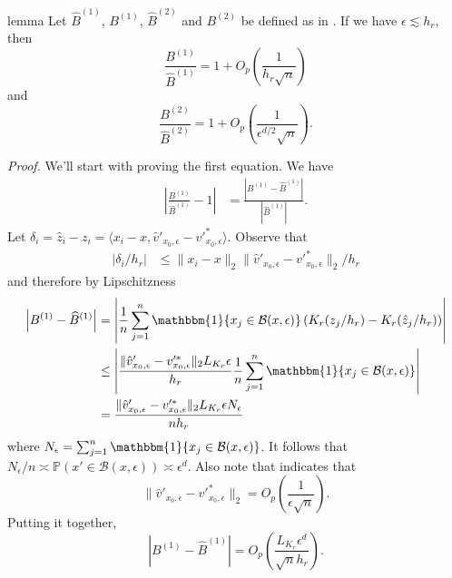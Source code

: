 \documentclass[11pt]{article}
\begin{document}
\begin{restatable}{lemma}{} \label{lemma: regression ratios}
    Let $\widehat{B}^{(1)}$, $B^{(1)}$, $\widehat{B}^{(2)}$ and $B^{(2)}$ be defined as in . If we have $\epsilon \lesssim  h_r$, then
    \begin{equation}
        \frac{B^{(1)}}{\widehat{B}^{(1)}} = 1 +  O_p\left(\frac{1}{h_r\sqrt{n}}\right)
    \end{equation}
    and 
    \begin{equation}
        \frac{B^{(2)}}{\widehat{B}^{(2)}} = 1 + O_p\left(\frac{1}{\epsilon^{d/2}\sqrt{n}}\right).
    \end{equation}
\end{restatable}
\noindent \textit{Proof.} We'll start with proving the first equation. We have
\begin{align}
    \left|\frac{B^{(1)}}{\widehat{B}^{(1)}} - 1\right| &= \frac{\left|B^{(1)} - \widehat{B}^{(1)}\right|}{\left|\widehat{B}^{(1)}\right|}.
\end{align}
Let $\delta_i = \hat{z}_i - z_i = \langle x_i - x, \hat{v}'_{x_0, \epsilon} - v'^*_{x_0, \epsilon} \rangle$. Observe that
\begin{align*}
    \left|\delta_i/h_r\right| &\leq \|x_i - x\|_2\|\hat{v}'_{x_0, \epsilon} - v'^*_{x_0, \epsilon}\|_2/h_r
\end{align*}
and therefore by Lipschitzness
\begin{align}
    \left|B^{(1)} - \widehat{B}^{(1)}\right| &= \left|\frac{1}{n}\sum_{j = 1}^{n}\mathbbm{1}\{x_j \in \mathcal{B}(x, \epsilon)\}\left(K_r(z_j/h_r) - K_r(\hat{z}_j/h_r)\right)\right| \\
    &\leq \left|\frac{\|\hat{v}'_{x_0, \epsilon} - v'^*_{x_0, \epsilon}\|_2L_{K_r}\epsilon}{h_r}\frac{1}{n}\sum_{j = 1}^{n}\mathbbm{1}\{x_j \in \mathcal{B}(x, \epsilon)\}\right| \\
    &= \frac{\|\hat{v}'_{x_0, \epsilon} - v'^*_{x_0, \epsilon}\|_2L_{K_r}\epsilon N_{\epsilon}}{nh_r}
\end{align}
where $N_\epsilon = \sum_{j = 1}^{n}\mathbbm{1}\{x_j \in \mathcal{B}(x, \epsilon)\}$. It follows that $N_{\epsilon}/n \asymp \mathbb{P}(x' \in \mathcal{B}(x,\epsilon)) \asymp \epsilon^d$. Also note that  indicates that 
\[\|\hat{v}'_{x_0, \epsilon} - v'^*_{x_0, \epsilon}\|_2 = O_p\left(\frac{1}{\epsilon\sqrt{n}}\right).\]
Putting it together,
\[\left|B^{(1)} - \widehat{B}^{(1)}\right| = O_p\left(\frac{L_{K_r} \epsilon^d}{\sqrt{n}h_r}\right).\]
\end{document}
